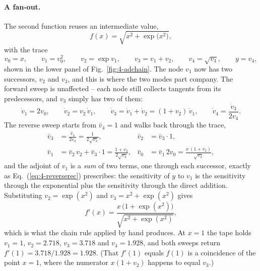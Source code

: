\paragraph{A fan-out.}
The second function reuses an intermediate value,
\begin{equation}
  f(x)=\sqrt{x^{2}+\exp\bigl(x^{2}\bigr)} ,
  \label{eq:4-adfanoutfun}
\end{equation}
with the trace
\begin{equation}
  v_0 = x,\qquad v_1 = v_0^{2},\qquad v_2 = \exp v_1,\qquad
  v_3 = v_1 + v_2,\qquad v_4 = \sqrt{v_3},\qquad y = v_4 ,
  \label{eq:4-adfanouttrace}
\end{equation}
shown in the lower panel of Fig.~\ref{fig:4-adchain}.  The node $v_1$ now
has two successors, $v_2$ and $v_3$, and this is where the two modes part
company.  The forward sweep is unaffected -- each node still collects
tangents from its predecessors, and $v_3$ simply has two of them:
\begin{equation}
  \dot v_1 = 2v_0,\qquad
  \dot v_2 = v_2\,\dot v_1,\qquad
  \dot v_3 = \dot v_1 + \dot v_2 = (1+v_2)\,\dot v_1,\qquad
  \dot v_4 = \frac{\dot v_3}{2v_4} .
  \label{eq:4-adfanoutforward}
\end{equation}
The reverse sweep starts from $\bar v_4=1$ and walks back through the
trace,
\begin{equation}
  \begin{aligned}
  \bar v_3 &= \frac{\bar v_4}{2v_4} = \frac{1}{2\sqrt{v_3}}, &
  \bar v_2 &= \bar v_3\cdot 1,\\
  \bar v_1 &= \bar v_2\,v_2 + \bar v_3\cdot 1 = \frac{1+v_2}{2\sqrt{v_3}}, &
  \bar v_0 &= \bar v_1\,2v_0 = \frac{x\,(1+v_2)}{\sqrt{v_3}} ,
  \end{aligned}
  \label{eq:4-adfanoutreverse}
\end{equation}
and the adjoint of $v_1$ is a \emph{sum} of two terms, one through each
successor, exactly as Eq.~(\ref{eq:4-reverserec}) prescribes: the
sensitivity of $y$ to $v_1$ is the sensitivity through the exponential plus
the sensitivity through the direct addition.  Substituting $v_2=\exp(x^{2})$
and $v_3=x^{2}+\exp(x^{2})$ gives
\begin{equation}
  f'(x) = \frac{x\,\bigl(1+\exp(x^{2})\bigr)}{\sqrt{x^{2}+\exp(x^{2})}} ,
  \label{eq:4-adfanoutclosed}
\end{equation}
which is what the chain rule applied by hand produces.  At $x=1$ the
tape holds $v_1=1$, $v_2=2.718$, $v_3=3.718$ and $v_4=1.928$, and both
sweeps return $f'(1)=3.718/1.928=1.928$.  (That $f'(1)$ equals $f(1)$ is a coincidence of
the point $x=1$, where the numerator $x(1+v_2)$ happens to equal $v_3$.)

